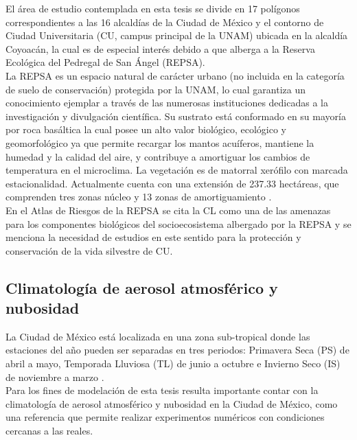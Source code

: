 \newpage

El área de estudio contemplada en esta tesis se divide en 17 polígonos correspondientes a las 16 alcaldías de la Ciudad de México y el contorno de Ciudad Universitaria (CU, campus principal de la UNAM) ubicada en la alcaldía Coyoacán, la cual es de especial interés debido a que alberga a la Reserva Ecológica del Pedregal de San Ángel (REPSA).\\

La REPSA es un espacio natural de carácter urbano (no incluida en la categoría de suelo de conservación) protegida por la UNAM, lo cual garantiza un conocimiento ejemplar a través de las numerosas instituciones dedicadas a la investigación y divulgación científica. Su sustrato está conformado en su mayoría por roca basáltica la cual posee un alto valor biológico, ecológico y geomorfológico ya que permite recargar los mantos acuíferos, mantiene la humedad y la calidad del aire, y contribuye a amortiguar los cambios de temperatura en el microclima. La vegetación es de matorral xerófilo con marcada estacionalidad. Actualmente cuenta con una extensión de 237.33 hectáreas, que comprenden tres zonas núcleo y 13 zonas de amortiguamiento \citep{REPSA2019}.\\

En el Atlas de Riesgos de la REPSA \citep{AtlasREPSA} se cita la CL como una de las amenazas para los componentes biológicos del socioecosistema albergado por la REPSA y se menciona la necesidad de estudios en este sentido para la protección y conservación de la vida silvestre de CU.\\


\subsection{Climatología de aerosol atmosférico y nubosidad}
\label{subsec:climatologia}

La Ciudad de México está localizada en una zona sub-tropical donde las estaciones del año pueden ser separadas en tres periodos: Primavera Seca (PS) de abril a mayo, Temporada Lluviosa (TL) de junio a octubre e Invierno Seco (IS) de noviembre a marzo \citep{Jauregui2002}.\\

Para los fines de modelación de esta tesis resulta importante contar con la climatología de aerosol atmosférico y nubosidad en la Ciudad de México, como una referencia que permite realizar experimentos numéricos con condiciones cercanas a las reales.\\

